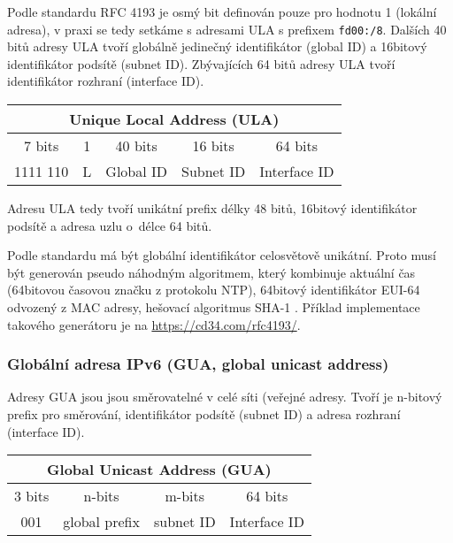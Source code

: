   Podle standardu RFC 4193 \cite{rfc4193} je osmý bit definován pouze pro hodnotu 1 (lokální adresa), v praxi se tedy setkáme s adresami ULA s prefixem {\tt fd00:/8}. Dalších 40 bitů adresy ULA tvoří globálně jedinečný identifikátor (global ID) a 16bitový identifikátor podsítě (subnet ID). Zbývajících 64 bitů adresy ULA tvoří identifikátor rozhraní (interface ID).

\begin{table}[h]
  \begin{center}
    \begin{tabular}{|c|c|c|c|c|}
      \multicolumn{5}{c}{Unique Local Address (ULA)}\\
      \hline
      7 bits & 1 &  40 bits  &  16 bits  & 64 bits \\
      \hline
      1111 110 & L & Global ID & Subnet ID & Interface ID \\
      \hline
    \end{tabular}
  \end{center}
\end{table}
Adresu ULA tedy tvoří unikátní prefix délky 48 bitů, 16bitový identifikátor podsítě a  adresa uzlu o~délce 64 bitů.

  Podle standardu má být globální identifikátor celosvětově unikátní. Proto musí být generován pseudo náhodným algoritmem, který kombinuje aktuální čas (64bitovou časovou značku z protokolu NTP), 64bitový identifikátor EUI-64 odvozený z MAC adresy, hešovací algoritmus SHA-1 \cite{rfc4193}. Příklad implementace takového generátoru je na \url{https://cd34.com/rfc4193/}.

  \subsubsection{Globální adresa IPv6 (GUA, global unicast address)}
Adresy GUA jsou jsou směrovatelné v celé síti (veřejné adresy. Tvoří je n-bitový prefix pro směrování, identifikátor podsítě (subnet ID) a adresa rozhraní (interface ID). 

\begin{table}[h]
  \begin{center}
    \begin{tabular}{|c|c|c|c|}
        \multicolumn{4}{c}{Global Unicast Address (GUA)}\\
        \hline
        3 bits & n-bits & m-bits & 64 bits \\
        \hline
        001 & global prefix & subnet ID & Interface ID \\
        \hline
    \end{tabular}
  \end{center}
\end{table}

